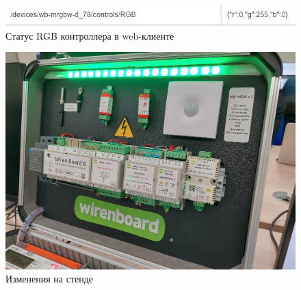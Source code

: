 \documentclass[a4paper,14pt]{extarticle}
\begin{document}
\begin{figure}[htbp]
	\centering
	\includegraphics[width=0.7\linewidth]{images/ssh-powershell4.2}
	\caption{Статус RGB контроллера в web-клиенте}
	\label{fig:ssh-web-client}
\end{figure}


\begin{figure}[htbp]
	\centering
	\includegraphics[width=0.6\linewidth]{images/ssh-powershell4.1}
	\caption{Изменения на стенде}
	\label{fig:ssh-stend}
\end{figure}









\newpage
\end{document}
